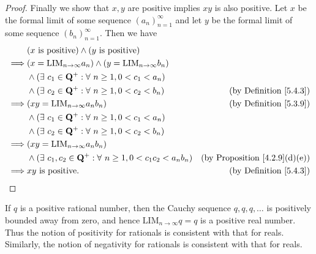 \begin{proof}
    Finally we show that \(x, y\) are positive implies \(xy\) is also positive.
    Let \(x\) be the formal limit of some sequence \((a_n)_{n = 1}^{\infty}\) and let \(y\) be the formal limit of some sequence \((b_n)_{n = 1}^{\infty}\).
    Then we have
    \begin{align*}
                 & (x \text{ is positive}) \land (y \text{ is positive})                                                                             \\
        \implies & (x = \text{LIM}_{n \to \infty} a_n) \land (y = \text{LIM}_{n \to \infty} b_n)                                                     \\
                 & \land (\exists\ c_1 \in \mathbf{Q}^+ : \forall\ n \geq 1, 0 < c_1 < a_n)                                                          \\
                 & \land (\exists\ c_2 \in \mathbf{Q}^+ : \forall\ n \geq 1, 0 < c_2 < b_n)              & \text{(by Definition \ref{5.4.3})}        \\
        \implies & (xy = \text{LIM}_{n \to \infty} a_n b_n)                                              & \text{(by Definition \ref{5.3.9})}        \\
                 & \land (\exists\ c_1 \in \mathbf{Q}^+ : \forall\ n \geq 1, 0 < c_1 < a_n)                                                          \\
                 & \land (\exists\ c_2 \in \mathbf{Q}^+ : \forall\ n \geq 1, 0 < c_2 < b_n)                                                          \\
        \implies & (xy = \text{LIM}_{n \to \infty} a_n b_n)                                                                                          \\
                 & \land (\exists\ c_1, c_2 \in \mathbf{Q}^+ : \forall\ n \geq 1, 0 < c_1 c_2 < a_n b_n) & \text{(by Proposition \ref{4.2.9}(d)(e))} \\
        \implies & xy \text{ is positive}.                                                               & \text{(by Definition \ref{5.4.3})}
    \end{align*}
\end{proof}

\begin{note}
    If \(q\) is a positive rational number, then the Cauchy sequence \(q, q, q, \dots\) is positively bounded away from zero, and hence \(\text{LIM}_{n \to \infty} q = q\) is a positive real number.
    Thus the notion of positivity for rationals is consistent with that for reals.
    Similarly, the notion of negativity for rationals is consistent with that for reals.
\end{note}

